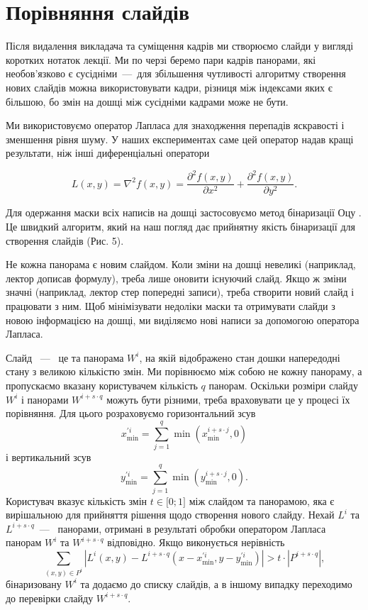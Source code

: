 \section{Порівняння слайдів}

Після видалення викладача та суміщення кадрів ми створюємо слайди у вигляді
коротких нотаток лекції. Ми по черзі беремо пари кадрів панорами, які
необов'язково є сусідніми~---~для збільшення чутливості алгоритму створення нових
слайдів можна використовувати кадри, різниця між індексами яких є більшою, бо
змін на дошці між сусідніми кадрами може не бути.

Ми використовуємо оператор Лапласа  для знаходження перепадів
яскравості і зменшення рівня шуму. У наших експериментах саме цей
оператор надав кращі результати, ніж інші диференціальні оператори

\begin{equation*}
  L(x,y) = \nabla^{2}f(x,y) = \frac{\partial^{2}f(x,y)}{\partial x^{2}} + \frac{\partial^{2}f(x,y)}{\partial y^{2}}.
\end{equation*}

Для одержання маски всіх написів на дошці застосовуємо метод бінаризації
Оцу . Це швидкий алгоритм, який на наш погляд дає прийнятну
якість бінаризації для створення слайдів (Рис. 5).

Не кожна панорама є новим слайдом. Коли зміни на дошці невеликі
(наприклад, лектор дописав формулу), треба лише оновити існуючий слайд.
Якщо ж зміни значні (наприклад, лектор стер попередні записи), треба
створити новий слайд і працювати з ним. Щоб мінімізувати недоліки маски
та отримувати слайди з новою інформацією на дошці, ми виділяємо нові
написи за допомогою оператора Лапласа.

Слайд ~---~ це та панорама \(W^{i}\), на якій відображено стан дошки
напередодні стану з великою кількістю змін. Ми порівнюємо між собою не
кожну панораму, а пропускаємо вказану користувачем кількість \(q\)
панорам. Оскільки розміри слайду \(W^{i}\) і панорами
\(W^{i + s \cdot q}\) можуть бути різними, треба враховувати це у
процесі їх порівняння. Для цього розраховуємо горизонтальний зсув
$$x_{\min}^{'i} = \sum_{j = 1}^{q}{\min\left( x_{\min}^{i + s \cdot j},0 \right)}$$
і вертикальний зсув
$$y_{\min}^{'i} = \sum_{j = 1}^{q}{\min\left( y_{\min}^{i + s \cdot j},0 \right)}.$$
Користувач вказує кількість змін \(t \in \lbrack 0;1\rbrack\) між
слайдом та панорамою, яка є вирішальною для прийняття рішення щодо
створення нового слайду. Нехай \(L^{i}\) та \(L^{i + s \cdot q}\)~---~
панорами, отримані в результаті обробки оператором Лапласа панорам \(W^{i}\) та
\(W^{i + s \cdot q}\) відповідно. Якщо виконується нерівність
\begin{equation*}
\sum_{(x,y) \in P^{i}}^{}| L^{i}(x,y) - L^{i + s \cdot q}( x - x_{\min}^{'i},y - y_{\min}^{'i} ) | > t \cdot | P^{i + s \cdot q} |,
\end{equation*}
бінаризовану \(W^{i}\) та додаємо до списку слайдів, а в іншому випадку переходимо до
перевірки слайду \(W^{i + s \cdot q}\).
